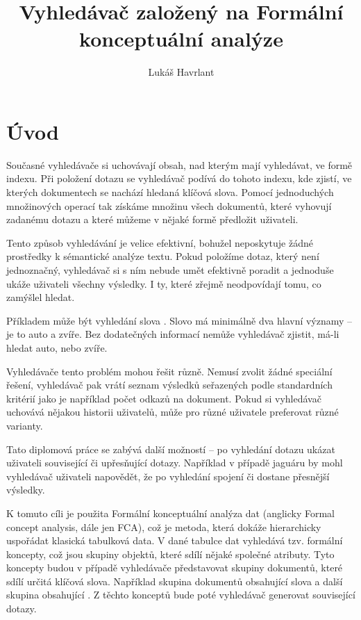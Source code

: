 \documentclass[12pt]{article}
\title{Vyhledávač založený na Formální konceptuální analýze}
\author{Lukáš Havrlant}
\begin{document}
\maketitle
\newpage


\section*{Úvod}

Současné vyhledávače si uchovávají obsah, nad kterým mají vyhledávat, ve formě indexu. Při položení dotazu se vyhledávač podívá do tohoto indexu, kde zjistí, ve kterých dokumentech se nachází hledaná klíčová slova. Pomocí jednoduchých množinových operací tak získáme množinu všech dokumentů, které vyhovují zadanému dotazu a které můžeme v nějaké formě předložit uživateli. 

Tento způsob vyhledávání je velice efektivní, bohužel neposkytuje žádné prostředky k sémantické analýze textu. Pokud položíme dotaz, který není jednoznačný, vyhledávač si s ním nebude umět efektivně poradit a jednoduše ukáže uživateli všechny výsledky. I ty, které zřejmě neodpovídají tomu, co zamýšlel hledat. 

Příkladem může být vyhledání slova . Slovo  má minimálně dva hlavní významy -- je to auto a zvíře. Bez dodatečných informací nemůže vyhledávač zjistit, má-li hledat auto, nebo zvíře. 

Vyhledávače tento problém mohou řešit různě. Nemusí zvolit žádné speciální řešení, vyhledávač pak vrátí seznam výsledků seřazených podle standardních kritérií jako je například počet odkazů na dokument. Pokud si vyhledávač uchovává nějakou historii uživatelů, může pro různé uživatele preferovat různé varianty. 

Tato diplomová práce se zabývá další možností -- po vyhledání dotazu ukázat uživateli související či upřesňující dotazy. Například v případě jaguáru by mohl vyhledávač uživateli napovědět, že po vyhledání spojení  či  dostane přesnější výsledky. 

K tomuto cíli je použita Formální konceptuální analýza dat (anglicky Formal concept analysis, dále jen FCA), což je metoda, která dokáže hierarchicky uspořádat klasická tabulková data. V dané tabulce dat vyhledává tzv. formální koncepty, což jsou skupiny objektů, které sdílí nějaké společné atributy. Tyto koncepty budou v případě vyhledávače představovat skupiny dokumentů, které sdílí určitá klíčová slova. Například skupina dokumentů obsahující slova  a další skupina obsahující . Z těchto konceptů bude poté vyhledávač generovat související dotazy.
\end{document}
